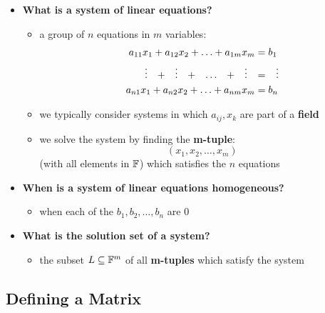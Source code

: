 \documentclass{exam}
\begin{document}
\begin{itemize}
    \item \textbf{What is a system of linear equations?}
    \begin{itemize}
        \item a group of $n$ equations in $m$ variables:
        \begin{align*}
            a_{11}x_{1} + a_{12}x_2 + \ldots + a_{1m}x_m &= b_1 \\
            \vdots \hspace{0.27cm} + \hspace{0.27cm} \vdots  \hspace{0.27cm} + \hspace{0.27cm} \ldots \hspace{0.27cm} + \hspace{0.27cm} \vdots \hspace{0.27cm} &=  \hspace{0.27cm} \vdots \\ 
            a_{n1}x_1 + a_{n2}x_2 + \ldots + a_{nm}x_m &= b_n
        \end{align*}
        \item we typically consider systems in which $a_{ij}, x_{k}$ are part of a \textbf{field} 
        \item we solve the system by finding the \textbf{m-tuple}:
        \[
        (x_1, x_2, \ldots, x_m)
        \]
        (with all elements in $\mathbb{F}$) which satisfies the $n$ equations
    \end{itemize}
    \item \textbf{When is a system of linear equations homogeneous?}
    \begin{itemize}
        \item when each of the $b_1, b_2, \ldots, b_n$ are 0
    \end{itemize}
    \item \textbf{What is the solution set of a system?}
    \begin{itemize}
        \item the subset $L \subseteq \mathbb{F}^m$ of all \textbf{m-tuples} which satisfy the system
    \end{itemize}
\end{itemize}

\subsection{Defining a Matrix}
\end{document}
